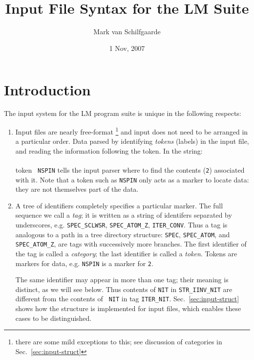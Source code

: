 \documentclass{article}
\begin{document}
\title{\Large Input File Syntax for the LM Suite}
\author{Mark van Schilfgaarde}
\date{1 Nov, 2007}
\maketitle

\section{\large Introduction}
\label{sec:intro}

The input system for the LM program suite is unique in the following
respects:
\begin{enumerate}

\item Input files are nearly free-format \footnote{there are some mild
      exceptions to this; see discussion of categories in
      Sec.~\ref{sec:input-struct}} and input does not need to be arranged
      in a particular order.  Data parsed by identifying \emph{tokens}
      (labels) in the input file, and reading the information following the
      token.  In the string:\\  \\ token {\tt
      NSPIN} tells the input parser where to find the contents ({\tt 2})
      associated with it.  Note that a token such as {\tt{}NSPIN} only acts
      as a marker to locate data: they are not themselves part of the data.

\item A tree of identifiers completely specifies a particular marker.  The
      full sequence we call a \emph{tag}; it is written as a string of
      identifers separated by underscores, e.g. {\tt SPEC\_SCLWSR},
      {\tt{}SPEC\_ATOM\_Z}, {\tt ITER\_CONV}.  Thus a tag is analogous to a
      path in a tree directory structure: {\tt{}SPEC}, {\tt{}SPEC\_ATOM},
      and {\tt{}SPEC\_ATOM\_Z}, are tags with successively more
      branches.  The first identifier of the tag is called a \emph{category};
      the last identifier is called a \emph{token}.
      Tokens are markers for data, e.g. {\tt{}NSPIN} is a marker for {\tt 2}.

      The same identifier may appear in more than one tag; their meaning is
      distinct, as we will see below.  Thus contents of {\tt NIT} in
      {\tt STR\_IINV\_NIT} are different from the contents of {\tt
      NIT} in tag {\tt ITER\_NIT}.  Sec.~\ref{sec:input-struct} shows
      how the structure is implemented for input files, which enables these
      cases to be distinguished.


\end{enumerate}
\end{document}
